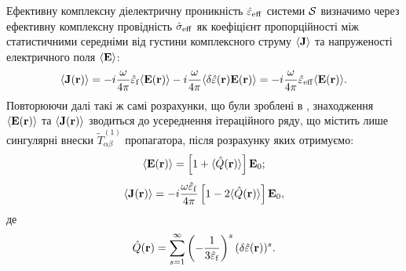 \documentclass[14pt,twoside]{vakthesis}
\begin{document}
Ефективну комплексну діелектричну проникність $\hat{\varepsilon}_{\rm eff}$ системи $\cal S$ визначимо через ефективну комплексну провідність $\hat{\sigma}_{\rm eff}$
як коефіцієнт пропорційності між статистичними середніми від густини комплексного струму $\langle{\bf J}\rangle$ та напруженості електричного поля $\langle {\bf E} \rangle$:
\begin{equation}\label{eq:eff_complex}
\langle {\bf{J}} ({\bf{r}})\rangle =-i\frac{\omega}{4\pi} \hat{\varepsilon}_{\rm f} \langle {\bf{E}} ({\bf{r}}) \rangle
-i\frac{\omega}{4\pi}\langle \delta\hat{\varepsilon} ({\bf{r}}) {\bf{E}}
({\bf{r}}) \rangle = -i\frac{\omega}{4\pi} \hat{\varepsilon}_{\rm
	eff} \langle {\bf{E}} ({\bf{r}}) \rangle.
\end{equation}
Повторюючи далі такі ж самі розрахунки, що були зроблені в \cite{Sushko2007, Sushko2017}, знаходження $\langle {\bf E}({\bf r}) \rangle$ та $\langle {\bf J}({\bf r}) \rangle$ зводиться до усереднення ітераційного ряду, що містить лише сингулярні внески $\widetilde{T}^{(1)}_{\alpha\beta}$ пропагатора, після розрахунку яких отримуємо:
\begin{equation}\label{eq:E_average-complex}
\langle {\bf E} ({\bf r}) \rangle = \left[ 1 + \langle \hat{Q}({\bf r}) \rangle \right] {\bf E}_0;
\end{equation}
\begin{equation}\label{eq:C_average}
\langle {\bf J} ({\bf r}) \rangle = - i \frac{\omega\hat{\varepsilon}_{\rm f}}{4\pi} \left[ 1 - 2\langle \hat{Q}({\bf r}) \rangle \right] {\bf E}_0,
\end{equation}
де
\begin{equation}\label{eq:Q-complex}
\hat{Q}({\bf r}) = \sum\limits_{s=1}^{\infty} \left( - \frac{1}{3\hat{\varepsilon}_{\rm f}} \right)^s (\delta\hat{\varepsilon}({\bf r}))^s.
\end{equation}
\end{document}
